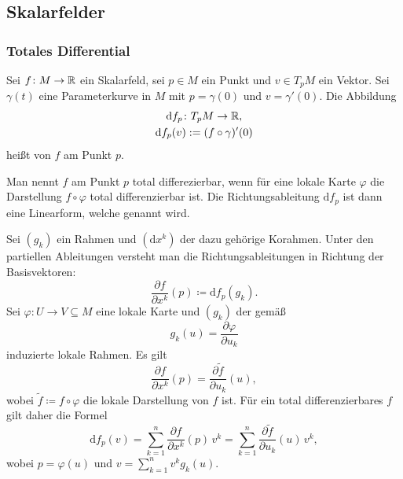 \subsection{Skalarfelder}
\subsubsection{Totales Differential}
\begin{definition}[Richtungsableitung]\mbox{}\newline
Sei $f\colon M\to\mathbb R$ ein Skalarfeld, sei $p\in M$ ein Punkt
und $v\in T_p M$ ein Vektor. Sei $\gamma(t)$ eine Parameterkurve in $M$
mit $p=\gamma(0)$ und $v=\gamma'(0)$. Die Abbildung%
\begin{gather}
\mathrm df_p\colon T_p M\to\mathbb R,\\
\mathrm df_p(v) := (f\circ\gamma)'(0)
\end{gather}
heißt  von $f$ am Punkt $p$.
\end{definition}
\begin{definition}\mbox{}\newline
Man nennt $f$ am Punkt $p$ total differezierbar, wenn für eine lokale
Karte $\varphi$ die Darstellung $f\circ\varphi$ total differenzierbar
ist. Die Richtungsableitung $\mathrm df_p$ ist dann eine
Linearform, welche 
genannt wird.
\end{definition}
Sei $(g_k)$ ein Rahmen und $(\mathrm dx^k)$ der dazu gehörige
Korahmen. Unter den partiellen Ableitungen versteht man die
Richtungsableitungen in Richtung der Basisvektoren:%
\begin{equation}
\frac{\partial f}{\partial x^k}(p)\coloneq \mathrm df_p(g_k).
\end{equation}
Sei $\varphi\colon U\to V\subseteq M$ eine lokale Karte und
$(g_k)$ der gemäß%
\begin{equation}
g_k(u) = \frac{\partial\varphi}{\partial u_k}
\end{equation}
induzierte lokale Rahmen. Es gilt
\begin{equation}
\frac{\partial f}{\partial x^k}(p) = \frac{\partial\tilde f}{\partial u_k}(u),
\end{equation}
wobei $\tilde f\coloneq f\circ\varphi$ die
lokale Darstellung von $f$ ist. Für ein total differenzierbares $f$
gilt daher die Formel%
\begin{equation}
\mathrm df_p(v) = \sum_{k=1}^n \frac{\partial f}{\partial x^k}(p)\,v^k
= \sum_{k=1}^n \frac{\partial\tilde f}{\partial u_k}(u)\,v^k,
\end{equation}
wobei $p=\varphi(u)$ und $v=\sum_{k=1}^n v^k g_k(u)$.

